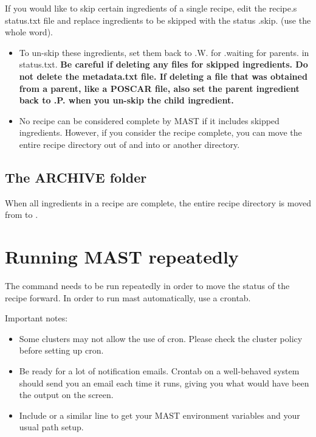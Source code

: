 \documentclass[letterpaper,10pt,english]{sphinxmanual}
\begin{document}
If you would like to skip certain ingredients of a single recipe, edit the recipe.s status.txt file and replace ingredients to be skipped with the status .skip. (use the whole word).
\begin{itemize}
\item {} 
To un-skip these ingredients, set them back to .W. for .waiting for parents. in status.txt. \textbf{Be careful if deleting any files for skipped ingredients. Do not delete the metadata.txt file. If deleting a file that was obtained from a parent, like a POSCAR file, also set the parent ingredient back to .P. when you un-skip the child ingredient.}

\item {} 
No recipe can be considered complete by MAST if it includes skipped ingredients. However, if you consider the recipe complete, you can move the entire recipe directory out of  and into  or another directory.

\end{itemize}


\subsection{The ARCHIVE folder}
\label{5_0_runningmast:the-archive-folder}
When all ingredients in a recipe are complete, the entire recipe directory is moved from  to .


\section{Running MAST repeatedly}
\label{5_0_runningmast:running-mast-repeatedly}
The command  needs to be run repeatedly in order to move the status of the recipe forward. In order to run mast automatically, use a crontab.

Important notes:
\begin{itemize}
\item {} 
Some clusters may not allow the use of cron. Please check the cluster policy before setting up cron.

\item {} 
Be ready for a lot of notification emails. Crontab on a well-behaved system should send you an email each time it runs, giving you what would have been the output on the screen.

\item {} 
Include  or a similar line to get your MAST environment variables and your usual path setup.

\end{itemize}
\end{document}
